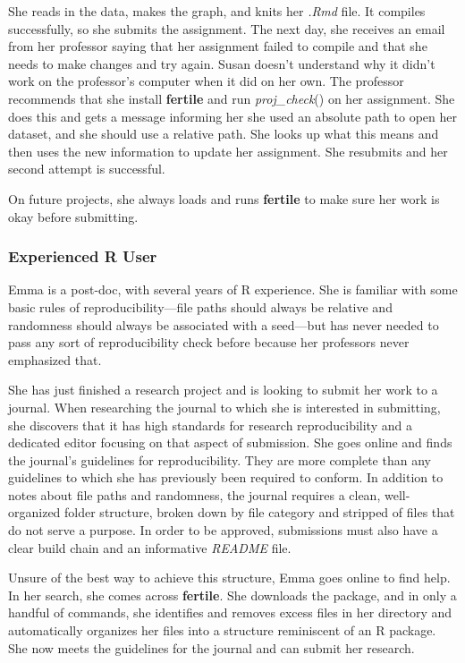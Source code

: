 \documentclass[APA,LATO1COL]{WileyNJD-v2}\usepackage[]{graphicx}\usepackage[]{color}
\newcommand{\R}{\textsf{R}\xspace}
\newcommand{\cmd}[1]{\textit{#1}}
\newcommand{\pkg}[1]{\textbf{#1}}
\newcommand{\func}[1]{\textit{#1}()}
\begin{document}
She reads in the data, makes the graph, and knits her \cmd{.Rmd} file. It compiles successfully, so she submits the assignment. The next day, she receives an email from her professor saying that her assignment failed to compile and that she needs to make changes and try again. Susan doesn't understand why it didn't work on the professor's computer when it did on her own. The professor recommends that she install \pkg{fertile} and run \func{proj\_check} on her assignment. She does this and gets a message informing her she used an absolute path to open her dataset, and she should use a relative path. She looks up what this means and then uses the new information to update her assignment. She resubmits and her second attempt is successful.

On future projects, she always loads and runs \pkg{fertile} to make sure her work is okay before submitting.

\subsubsection{Experienced \R User}

Emma is a post-doc, with several years of \R experience. She is familiar with some basic rules of reproducibility---file paths should always be relative and randomness should always be associated with a seed---but has never needed to pass any sort of reproducibility check before because her professors never emphasized that.

She has just finished a research project and is looking to submit her work to a journal. When researching the journal to which she is interested in submitting, she discovers that it has high standards for research reproducibility and a dedicated editor focusing on that aspect of submission. She goes online and finds the journal's guidelines for reproducibility. They are more complete than any guidelines to which she has previously been required to conform. In addition to notes about file paths and randomness, the journal requires a clean, well-organized folder structure, broken down by file category and stripped of files that do not serve a purpose. In order to be approved, submissions must also have a clear build chain and an informative \cmd{README} file.

Unsure of the best way to achieve this structure, Emma goes online to find help. In her search, she comes across \pkg{fertile}. She downloads the package, and in only a handful of commands, she identifies and removes excess files in her directory and automatically organizes her files into a structure reminiscent of an \R package. She now meets the guidelines for the journal and can submit her research.
\end{document}
